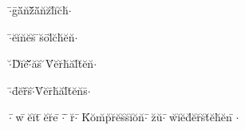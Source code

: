 \documentclass[output=paper]{LSP/langsci}
\begin{document}
\begin{exe} %
	\ex\label{couto:ex:11}$\cdot$\={ }g\={ }ä\u{ }n\u{ }z\={ }\uettl\u{ }\uettl\u{ }\uettl\={ }ä\u{ }n\u{ }z\u{ }l\u{ }i\u{ }c\u{ }h\u{ }$\cdot$
\end{exe}

\begin{exe} %
	\ex\label{couto:ex:12}$\cdot$\={ }e\u{ }i\u{ }n\u{ }e\u{ }s\u{ } \={ }s\u{ }o\={ }l\u{ }c\u{ }h\u{ }e\u{ }n\u{ }$\cdot$
\end{exe}

\begin{exe} %
	\ex\label{couto:ex:13}$\cdot$\u{ }D\u{ }i\u{ }e\u{ }$\cdot$\={ }\uettl\u{ }\uettl\u{ }\uettl\u{ }a\u{ }s\u{ } \u{ }V\u{ }e\u{ }r\u{ }h\u{ }a\u{ }l\u{ }t\u{ }e\u{ }n\u{ }$\cdot$
\end{exe}

\begin{exe} %
	\ex\label{couto:ex:14}$\cdot$\={ }d\={ }e\u{ }r\={ }\uettl\u{ }s\u{ }$\cdot$\u{ }V\u{ }e\u{ }r\={ }h\u{ }a\u{ }l\u{ }t\u{ }e\u{ }n\u{ }s\={ }$\cdot$
\end{exe}

\begin{exe}
	\ex\label{couto:ex:15}$\cdot$\={\,\,}w\={\,\,}e\u{ }i\u{ }t\={\,\,}e\u{ }r\u{ }e\={\,\,}$\cdot$\={\,}\uettl\={\,\,}r\u{ }$\cdot$\={\,\,}K\u{ }o\u{ }m\u{ }p\u{ }r\u{ }e\u{ }s\u{ }s\u{ }i\u{ }o\u{ }n\u{ }$\cdot$\={\,\,}z\u{ }u\u{ }$\cdot$\={\,\,}w\u{ }i\u{ }e\u{ }d\u{ }e\u{ }r\u{ }s\u{ }t\u{ }e\u{ }h\u{ }e\u{ }n\={\,\,}$\cdot$
\end{exe}
\end{document}
